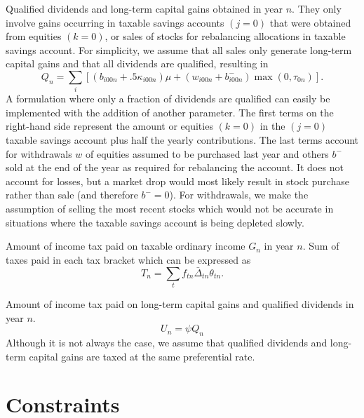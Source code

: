 \documentclass{article}[fleqn,12pt]
\begin{document}
\begin{description}[leftmargin=4em,style=multiline]
\item [$Q_n$]
	Qualified dividends and long-term capital gains obtained in year $n$.
	They only involve gains occurring in taxable savings accounts $(j=0)$ that
	were obtained from equities $(k=0)$, or sales of stocks for rebalancing allocations
	in taxable savings account.
	For simplicity, we assume that all sales only generate long-term capital gains and
	that all dividends are qualified, resulting in
	\begin{equation}
		\label{Eq:Qx2}
		Q_n = \sum_{i} [(b_{i00n} + .5\kappa_{i00n})\mu + (w_{i00n} + b^-_{i00n})\max(0, \tau_{0n})].
	\end{equation}
	A formulation where only a fraction of dividends are qualified can easily be
	implemented with the addition of another parameter.
	The first terms on the right-hand side represent the amount or equities $(k=0)$ in the $(j=0)$
	taxable savings account plus
	half the yearly contributions. The last terms account for withdrawals $w$ of equities assumed
	to be purchased last year and others $b^-$ sold at the end
	of the year as required for rebalancing the account. It does not account for losses, but a market drop
	would most likely result in stock purchase rather than sale (and therefore $b^- = 0$). For withdrawals, we make the assumption of
	selling the most recent stocks which would not be accurate in situations where
	the taxable savings account is being depleted slowly.
\item [$T_n$]
	Amount of income tax paid on taxable ordinary income $G_n$ in year $n$.
	Sum of taxes paid in each tax bracket which can be expressed as
	\begin{equation}
		\label{Eq:Tax}
		T_n = \sum_t f_{t n}\bar{\Delta}_{t n}\theta_{t n}.
	\end{equation}
\item [$U_n$]
	Amount of income tax paid on long-term capital gains and qualified dividends in year $n$.
	\begin{equation}
		U_n = \psi Q_n
	\end{equation}
	Although it is not always the case, we assume that qualified dividends and long-term
	capital gains are taxed at the same preferential rate.
\end{description}

\section{Constraints}
\end{document}
